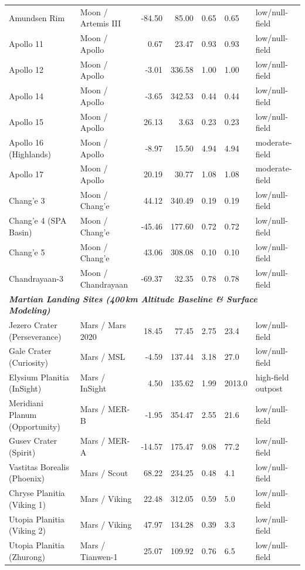 \begin{table}[t]
\begin{tabular}{llrrcll}
Amundsen Rim & Moon / Artemis III & -84.50 & 85.00 & 0.65 & 0.65 & low/null-field \\
Apollo 11 & Moon / Apollo & 0.67 & 23.47 & 0.93 & 0.93 & low/null-field \\
Apollo 12 & Moon / Apollo & -3.01 & 336.58 & 1.00 & 1.00 & low/null-field \\
Apollo 14 & Moon / Apollo & -3.65 & 342.53 & 0.44 & 0.44 & low/null-field \\
Apollo 15 & Moon / Apollo & 26.13 & 3.63 & 0.23 & 0.23 & low/null-field \\
Apollo 16 (Highlands) & Moon / Apollo & -8.97 & 15.50 & 4.94 & 4.94 & moderate-field \\
Apollo 17 & Moon / Apollo & 20.19 & 30.77 & 1.08 & 1.08 & moderate-field \\
Chang'e 3 & Moon / Chang'e & 44.12 & 340.49 & 0.19 & 0.19 & low/null-field \\
Chang'e 4 (SPA Basin) & Moon / Chang'e & -45.46 & 177.60 & 0.72 & 0.72 & low/null-field \\
Chang'e 5 & Moon / Chang'e & 43.06 & 308.08 & 0.10 & 0.10 & low/null-field \\
Chandrayaan-3 & Moon / Chandrayaan & -69.37 & 32.35 & 0.78 & 0.78 & low/null-field \\
\midrule
\multicolumn{7}{l}{\textbf{\textit{Martian Landing Sites (400\,km Altitude Baseline \& Surface Modeling)}}} \\
Jezero Crater (Perseverance) & Mars / Mars 2020 & 18.45 & 77.45 & 2.75 & 23.4 & low/null-field \\
Gale Crater (Curiosity) & Mars / MSL & -4.59 & 137.44 & 3.18 & 27.0 & low/null-field \\
Elysium Planitia (InSight) & Mars / InSight & 4.50 & 135.62 & 1.99 & 2013.0 & high-field outpost \\
Meridiani Planum (Opportunity) & Mars / MER-B & -1.95 & 354.47 & 2.55 & 21.6 & low/null-field \\
Gusev Crater (Spirit) & Mars / MER-A & -14.57 & 175.47 & 9.08 & 77.2 & low/null-field \\
Vastitas Borealis (Phoenix) & Mars / Scout & 68.22 & 234.25 & 0.48 & 4.1 & low/null-field \\
Chryse Planitia (Viking 1) & Mars / Viking & 22.48 & 312.05 & 0.59 & 5.0 & low/null-field \\
Utopia Planitia (Viking 2) & Mars / Viking & 47.97 & 134.28 & 0.39 & 3.3 & low/null-field \\
Utopia Planitia (Zhurong) & Mars / Tianwen-1 & 25.07 & 109.92 & 0.76 & 6.5 & low/null-field \\

\end{tabular}
\end{table}
